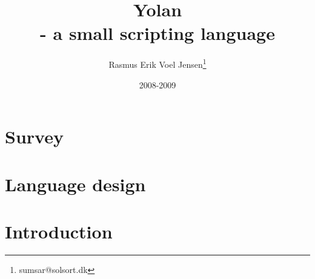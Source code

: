 \documentclass[12pt]{report}
\title{Yolan \\ - a small scripting language}
\author{
  Rasmus Erik Voel Jensen\footnote{
    sumsar@solsort.dk
  }
}
\date{2008-2009}
\begin{document}


\nocite{sicp}

\chapter{Survey}

\chapter{Language design}



\chapter{Introduction}
\end{document}
